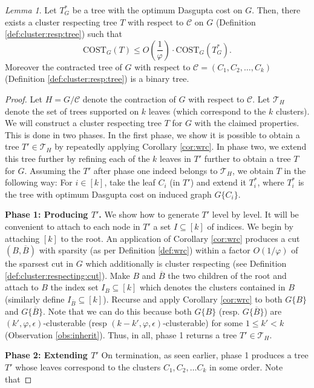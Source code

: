 \documentclass[letterpaper,11pt]{article}
\newcommand{\CT}{\text{COST}}
\newcommand{\cC}{\mathcal{C}}
\newcommand{\cT}{\mathcal{T}}
\theoremstyle{plain}
\theoremstyle{definition}
\theoremstyle{remark}
\newtheorem{lemmma}{Lemma}
\newcommand{\e}{\epsilon}
\begin{document}
\begin{lemmma} \label{lem:optimum-respects-clusters}
	Let $T^*_G$ be a tree with the optimum Dasgupta cost on $G$. Then, there exists a cluster respecting tree 
	$T$ with respect to $\cC$ on $G$ (Definition \ref{def:cluster:resp:tree}) such that 
	\[\CT_G(T) \leq O\left(\frac{1}{\varphi}\right)\cdot \CT_G(T^*_G) \text{.}\]
	Moreover the contracted tree of $G$ with respect to $\cC = (C_1, C_2, \ldots, C_k)$ 
	(Definition \ref{def:cluster:resp:tree}) is a binary tree.
\end{lemmma}
\begin{proof}
	Let $H = G/ \cC$ denote the contraction of $G$ with respect to $\cC$. Let $\cT_H$ 
	denote the set of trees supported on $k$ leaves (which correspond to the $k$ clusters).
	We will construct a cluster respecting tree $T$ for $G$ with the claimed properties.
	This is done in two phases. In the first phase, we show it is possible to
	obtain a tree $T' \in \cT_H$ by repeatedly applying Corollary \ref{cor:wrc}.
	In phase two, we extend this tree further by refining each of the $k$ leaves in $T'$ further 
	to obtain a tree $T$ for $G$. Assuming the $T'$ after phase one indeed belongs to $\cT_H$, we obtain $T$
	in the following way: For $i \in [k]$, take the leaf $C_i$ (in $T'$) and extend it $T^*_i$, where $T^*_i$ is the tree with optimum Dasgupta cost on induced graph $G\{C_i\}$.
	
	{\noindent \bf Phase 1: Producing $T'$.} We show how to generate $T'$ level by level.
	It will be convenient to attach to each node in $T'$ a set $I \subseteq [k]$ of indices.
	We begin by attaching $[k]$ to the root. An application of Corollary \ref{cor:wrc} produces 
	a cut $(B, \overline{B})$ with sparsity (as per Definition \ref{def:wrc}) within a factor $O(1/\varphi)$ of the 
	sparsest cut in $G$ which additionally is cluster respecting (see Definition 
	\ref{def:cluster:respecting:cut}). Make $B$ and $\overline{B}$ the two children of the root
	and attach to $B$ the index set $I_B \subseteq [k]$ which denotes the clusters contained in 
	$B$ (similarly define $I_{\overline{B}} \subseteq [k]$). Recurse and apply Corollary \ref{cor:wrc} to both $G\{B\}$ and $G\{\overline{B}\}$.  
	Note that we can do this because both $G\{B\}$ (resp. $G\{\overline{B}\}$) are 
	$(k', \varphi, \e)$-clusterable (resp $(k-k', \varphi, \e)$-clusterable) for some 
	$1 \leq k' < k$ (Observation \ref{obs:inherit}).
	Thus, in all, phase 1 returns a tree $T' \in \cT_H$.

	{\noindent \bf Phase 2: Extending $T'$} On termination, as seen earlier, phase 1 produces
	a tree $T'$ whose leaves correspond to the clusters $C_1, C_2, \ldots C_k$ in some order.
	Note that 


\end{proof}
\end{document}
